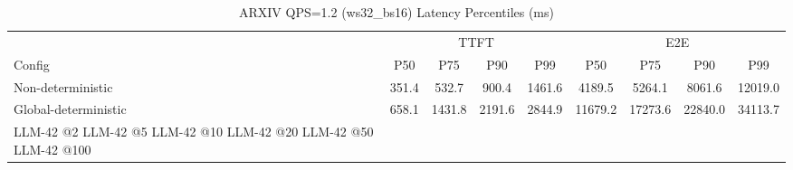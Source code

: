\begin{table}[htbp]
\centering
\caption{ARXIV QPS=1.2 (ws32_bs16) Latency Percentiles (ms)}
\label{tab:arxiv_qps1.2_ws32_bs16}
\begin{tabular}{l|cccc|cccc}
\toprule
& \multicolumn{4}{c|}{TTFT} & \multicolumn{4}{c}{E2E} \\
Config & P50 & P75 & P90 & P99 & P50 & P75 & P90 & P99 \\
\midrule
Non-deterministic & 351.4 & 532.7 & 900.4 & 1461.6 & 4189.5 & 5264.1 & 8061.6 & 12019.0 \\
Global-deterministic & 658.1 & 1431.8 & 2191.6 & 2844.9 & 11679.2 & 17273.6 & 22840.0 & 34113.7 \\
LLM-42 @2%
LLM-42 @5%
LLM-42 @10%
LLM-42 @20%
LLM-42 @50%
LLM-42 @100%
\bottomrule
\end{tabular}
\end{table}
